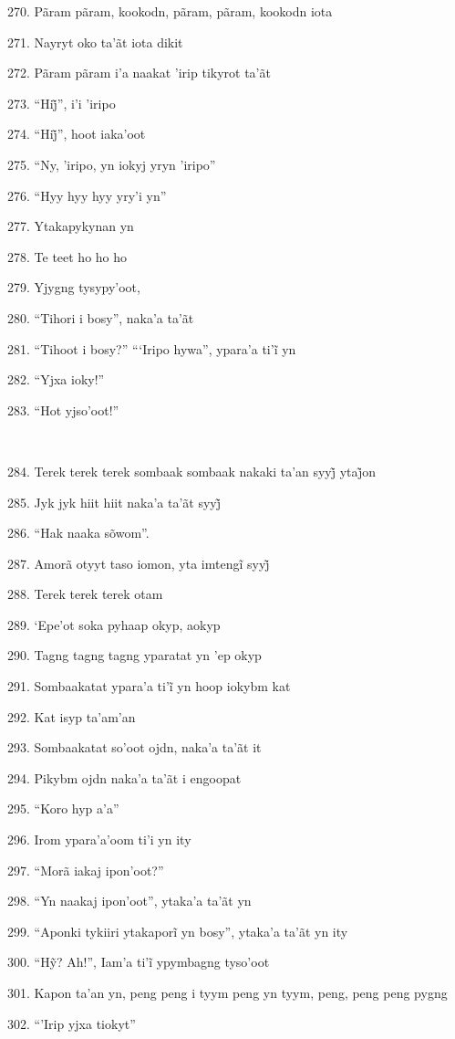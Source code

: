 270. Pãram pãram, kookodn, pãram, pãram, kookodn iota

271. Nayryt oko ta'ãt iota dikit

272. Pãram pãram i'a naakat 'irip tikyrot ta'ãt

273. “Hij̃”, i’i ’iripo

274. “Hij̃”, hoot iaka’oot

275. ``Ny, 'iripo, yn iokyj yryn 'iripo''

276. ``Hyy hyy hyy yry'i yn''

277. Ytakapykynan yn

278. Te teet ho ho ho

279. Yjygng tysypy'oot,

280. ``Tihori i bosy'', naka'a ta'ãt

281. “Tihoot i bosy?” “‘Iripo hywa”, ypara’a ti’ĩ yn

282. ``Yjxa ioky!''

283. ``Hot yjso'oot!''

~

284. Terek terek terek sombaak sombaak nakaki ta’an syyj̃ ytaj̃on

285. Jyk jyk hiit hiit naka’a ta’ãt syyj̃

286. ``Hak naaka sõwom''.

287. Amorã otyyt taso iomon, yta imtengĩ syyj̃

288. Terek terek terek otam

289. `Epe'ot soka pyhaap okyp, aokyp

290. Tagng tagng tagng yparatat yn 'ep okyp

291. Sombaakatat ypara’a ti’ĩ yn hoop iokybm kat

292. Kat isyp ta'am'an

293. Sombaakatat so'oot ojdn, naka'a ta'ãt it

294. Pikybm ojdn naka'a ta'ãt i engoopat

295. ``Koro hyp a'a''

296. Irom ypara'a'oom ti'i yn ity

297. ``Morã iakaj ipon'oot?''

298. ``Yn naakaj ipon'oot'', ytaka'a ta'ãt yn

299. “Aponki tykiiri ytakaporĩ yn bosy”, ytaka’a ta’ãt yn ity

300. “Hỹ? Ah!”, Iam’a ti’ĩ ypymbagng tyso’oot

301. Kapon ta'an yn, peng peng i tyym peng yn tyym, peng, peng peng pygng

302. ``'Irip yjxa tiokyt''

